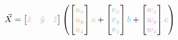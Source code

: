 \documentclass[preview]{standalone}
\begin{document}
$$\vec{X} = \begin{bmatrix}\textcolor[HTML]{fea294}{\hat{x}}&\textcolor[HTML]{81cb8f}{\hat{y}}&\textcolor[HTML]{91abf6}{\hat{z}}\end{bmatrix}\left(
\begin{bmatrix}\textcolor[HTML]{d7b760}{u}_{\textcolor[HTML]{fea294}{x}}\\\textcolor[HTML]{d7b760}{u}_{\textcolor[HTML]{81cb8f}{y}}\\\textcolor[HTML]{d7b760}{u}_{\textcolor[HTML]{91abf6}{z}}\end{bmatrix}\textcolor[HTML]{d7b760}{a} +
\begin{bmatrix}\textcolor[HTML]{46c6d9}{v}_{\textcolor[HTML]{fea294}{x}}\\\textcolor[HTML]{46c6d9}{v}_{\textcolor[HTML]{81cb8f}{y}}\\\textcolor[HTML]{46c6d9}{v}_{\textcolor[HTML]{91abf6}{z}}\end{bmatrix}\textcolor[HTML]{46c6d9}{b} +
\begin{bmatrix}\textcolor[HTML]{d290cd}{w}_{\textcolor[HTML]{fea294}{x}}\\\textcolor[HTML]{d290cd}{w}_{\textcolor[HTML]{81cb8f}{y}}\\\textcolor[HTML]{d290cd}{w}_{\textcolor[HTML]{91abf6}{z}}\end{bmatrix}\textcolor[HTML]{d290cd}{c}
\right)$$
\end{document}
